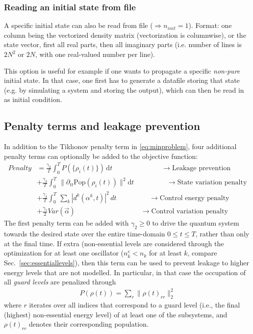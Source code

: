 \documentclass[11pt]{article}
\begin{document}
\subsubsection{Reading an initial state from file}
A specific initial state can also be read from file ($\Rightarrow n_{init}=1$). Format: one column being the vectorized density matrix (vectorization is columnwise), or the state vector, first all real parts, then all imaginary parts (i.e. number of lines is $2N^2$ or $2N$, with one real-valued number per line). 

This option is useful for example if one wants to propagate a specific \textit{non-pure} initial state. In that case, one first has to generate a datafile storing that state (e.g. by simulating a system and storing the output), which can then be read in as initial condition. 



\subsection{Penalty terms and leakage prevention}\label{sec:penalty}

In addition to the Tikhonov penalty term in \eqref{eq:minproblem}, four additional penalty terms can optionally be added to the objective function:
\begin{align*}
  Penalty &= \frac{\gamma_2}{T} \int_0^T P\left(\{\rho_i(t)\}\right) \, \mathrm{d} t   \hspace{3cm} \rightarrow \text{Leakage prevention}\\
         &+  \frac{\gamma_3}{T} \int_0^T \, \| \partial_{tt} \mbox{Pop}(\rho_i(t)) \|^2 \mathrm{d}t \hspace{2cm} \rightarrow \text{State variation penalty} \\
        &+\frac{\gamma_4}{T} \int_0^T \, \sum_k |d^k(\alpha^k,t)|^2\, dt  \hspace{2cm}\rightarrow  \text{Control energy penalty}\\
        &+ \frac{\gamma_5}{2} Var(\vec{\alpha}) \hspace{4cm}\rightarrow  \text{Control variation penalty}
\end{align*}
The first penalty term can be added with $\gamma_2 \geq 0$ to drive the quantum system towards the desired state over the entire time-domain $0\leq t\leq T$, rather than only at the final time. If extra (non-essential levels are considered through the optimization for at least one oscillator ($n_k^e < n_k$ for at least $k$, compare Sec.~\ref{sec:essentiallevels}), then this term can be used to prevent leakage to higher energy levels that are not modelled. In particular, in that case the occupation of all \textit{guard levels} are penalized through
\begin{align}\label{eq:leakprevention}
  P(\rho(t)) = \sum_{r} \| \rho(t)_{rr} \|^2_2
\end{align}
where $r$ iterates over all indices that correspond to a guard level (i.e., the final (highest) non-essential energy level) of at least one of the subsystems, and $\rho(t)_{rr}$ denotes their corresponding population. 
\end{document}
